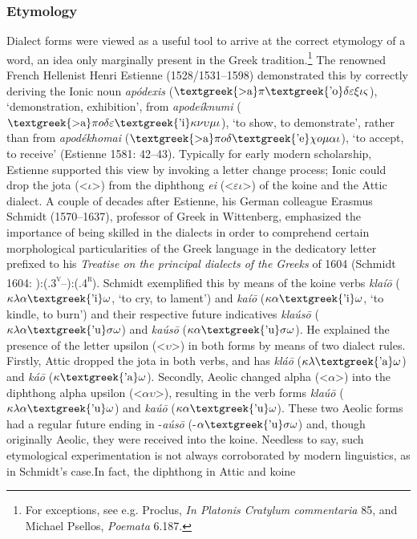 \subsubsection{Etymology}
\hypertarget{Toc19704821}{}\begin{styleStandard}
Dialect forms were viewed as a useful tool to arrive at the correct etymology of a word, an idea only marginally present in the Greek tradition.\footnote{ For exceptions, see e.g. Proclus, \textit{In Platonis Cratylum commentaria} 85, and Michael Psellos,\textit{ Poemata} 6.187.} The renowned French Hellenist Henri Estienne (1528/1531–1598) demonstrated this by correctly deriving the Ionic noun \textit{apódexis }($\text{\textgreek{>a}}\pi \text{\textgreek{'o}}\delta \varepsilon \xi \iota \varsigma $), ‘demonstration, exhibition’, from \textit{apodeíknumi }($\text{\textgreek{>a}}\pi o\delta \varepsilon \text{\textgreek{'i}}\kappa \nu \upsilon \mu \iota $), ‘to show, to demonstrate’, rather than from \textit{apodékhomai} ($\text{\textgreek{>a}}\pi o\delta \text{\textgreek{'e}}\chi o\mu \alpha \iota $), ‘to accept, to receive’ (Estienne 1581: 42–43). Typically for early modern scholarship, Estienne supported this view by invoking a letter change process; Ionic could drop the jota ({\textless}$\iota ${\textgreater}) from the diphthong \textit{ei} ({\textless}$\varepsilon \iota ${\textgreater}) of the koine and the Attic dialect. A couple of decades after Estienne, his German colleague Erasmus Schmidt (1570–1637), professor of Greek in Wittenberg, emphasized the importance of being skilled in the dialects in order to comprehend certain morphological particularities of the Greek language in the dedicatory letter prefixed to his \textit{Treatise on the principal dialects of the Greeks} of 1604 (Schmidt 1604: ):(.3\textsc{\textsuperscript{v}}–):(.4\textsc{\textsuperscript{r}}). Schmidt exemplified this by means of the koine verbs \textit{klaí\=o }($\kappa \lambda \alpha \text{\textgreek{'i}}\omega $, ‘to cry, to lament’) and \textit{kaí\=o} ($\kappa \alpha \text{\textgreek{'i}}\omega $, ‘to kindle, to burn’) and their respective future indicatives \textit{klaús\=o} ($\kappa \lambda \alpha \text{\textgreek{'u}}\sigma \omega $) and \textit{kaús\=o} ($\kappa \alpha \text{\textgreek{'u}}\sigma \omega $). He explained the presence of the letter upsilon ({\textless}$\upsilon ${\textgreater}) in both forms by means of two dialect rules. Firstly, Attic dropped the jota in both verbs, and has \textit{klá\=o} ($\kappa \lambda \text{\textgreek{'a}}\omega $) and \textit{ká\=o} ($\kappa \text{\textgreek{'a}}\omega $). Secondly, Aeolic changed alpha ({\textless}$\alpha ${\textgreater}) into the diphthong alpha upsilon ({\textless}$\alpha \upsilon ${\textgreater}), resulting in the verb forms \textit{klaú\=o} ($\kappa \lambda \alpha \text{\textgreek{'u}}\omega $) and \textit{kaú\=o} ($\kappa \alpha \text{\textgreek{'u}}\omega $). These two Aeolic forms had a regular future ending in -\textit{aús\=o} (-$\alpha \text{\textgreek{'u}}\sigma \omega $) and, though originally Aeolic, they were received into the koine. Needless to say, such etymological experimentation is not always corroborated by modern linguistics, as in Schmidt’s case.\textstyleFootnoteSymbol{ }In fact, the diphthong in Attic and koine 
\end{styleStandard}
